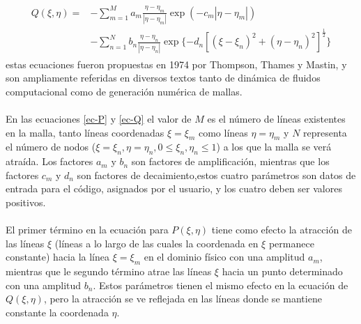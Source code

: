 \documentclass[letterpaper, openright, 12pt]{book}
\begin{document}
			\begin{align}
				\begin{aligned}
					Q(\xi, \eta) =& - \sum_{m = 1}^{M} a_{m} \frac{\eta - \eta_{m}}{|\eta - \eta_{m}|} \exp(-c_{m}|\eta - \eta_{m}|) \\&
					- \sum_{n=1}^{N} b_{n} \frac{\eta - \eta_{n}}{| \eta - \eta_{n} |} \exp\lbrace -d_{n} \left[ \left( \xi - \xi_{n} \right)^2 + \left( \eta - \eta_{n} \right)^2 \right]^\frac{1}{2} \rbrace
				\end{aligned}
				\label{ec-Q}
			\end{align}
			estas ecuaciones fueron propuestas en 1974 por Thompson, Thames y Mastin\cite{thompson1974automatic}, y son ampliamente referidas en diversos textos tanto de dinámica de fluidos computacional como de generación numérica de mallas.
			
		\paragraph*{}
			En las ecuaciones \ref{ec-P} y \ref{ec-Q} el valor de $M$ es el número de líneas existentes en la malla, tanto líneas coordenadas $\xi = \xi_{m}$ como líneas $\eta = \eta_{m}$ y $N$ representa el número de nodos ($\xi = \xi_{n}, \eta = \eta_{n}, 0 \leq \xi_{n}, \eta_{n} \leq 1$) a los que la malla se verá atraída. Los factores $a_{m}$ y $b_{n}$ son factores de amplificación, mientras que los factores $c_{m}$ y $d_{n}$ son factores de decaimiento,estos cuatro parámetros son datos de entrada para el código, asignados por el usuario, y los cuatro deben ser valores positivos.
			
		\paragraph*{}
			El primer término en la ecuación para $P(\xi, \eta)$ tiene como efecto la atracción de las líneas $\xi$ (líneas a lo largo de las cuales la coordenada en $\xi$ permanece constante) hacia la línea $\xi = \xi_{m}$ en el dominio físico con una amplitud $a_{m}$, mientras que le segundo término atrae las líneas $\xi$ hacia un punto determinado con una amplitud $b_{n}$. Estos parámetros tienen el mismo efecto en la ecuación de $Q(\xi, \eta)$, pero la atracción se ve reflejada en las líneas donde se mantiene constante la coordenada $\eta$.
\end{document}
